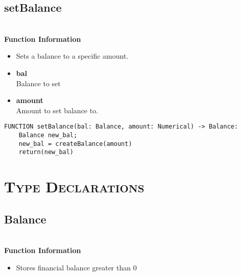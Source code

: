 \clearpage

\subsection{setBalance}
\textbf{ \\ Function Information}
\begin{itemize}
	\setlength{\itemsep}{5pt}
	\setlength{\parskip}{0pt}
	\setlength{\parsep}{0pt}
	\item Sets a balance to a specific amount.
	\item \textbf{bal} \\ Balance to set
	\item \textbf{amount} \\ Amount to set balance to.
\end{itemize}

\begin{verbatim}
FUNCTION setBalance(bal: Balance, amount: Numerical) -> Balance:
	Balance new_bal;
	new_bal = createBalance(amount)
	return(new_bal)
\end{verbatim}


\section{\textsc{Type Declarations}}

\subsection{Balance}
\textbf{ \\ Function Information}
\begin{itemize}
	\setlength{\itemsep}{5pt}
	\setlength{\parskip}{0pt}
	\setlength{\parsep}{0pt}
	\item Stores financial balance greater than 0
\end{itemize}


